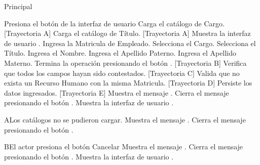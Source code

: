 \begin{UCtrayectoria}{Principal}

    \UCpaso[\UCactor] Presiona el botón  de la interfaz de usuario 
    \UCpaso Carga el catálogo de Cargo. [Trayectoria A]
    \UCpaso Carga el catálogo de Título. [Trayectoria A]
    \UCpaso Muestra la interfaz de usuario .
    \UCpaso[\UCactor] Ingresa la Matricula de Empleado.
    \UCpaso[\UCactor] Selecciona el Cargo.
    \UCpaso[\UCactor] Selecciona el Título.
    \UCpaso[\UCactor] Ingresa el Nombre.
    \UCpaso[\UCactor] Ingresa el Apellido Paterno.
    \UCpaso[\UCactor] Ingresa el Apellido Materno.
    \UCpaso[\UCactor] Termina la operación presionando el botón . [Trayectoria B]
    \UCpaso Verifica que todos los campos hayan sido contestados. [Trayectoria C]
    \UCpaso Valida que no exista un Recurso Humano con la misma Matricula. [Trayectoria D]
    \UCpaso Persiste los datos ingresados. [Trayectoria E]
    \UCpaso Muestra el mensaje .
    \UCpaso[\UCactor] Cierra el mensaje presionando el botón .
    \UCpaso Muestra la interfaz de usuario .
\end{UCtrayectoria}


\begin{UCtrayectoriaA}{A}{Los catálogos no se pudieron cargar.}
    \UCpaso Muestra el mensaje .
    \UCpaso[\UCactor] Cierra el mensaje presionando el botón .
\end{UCtrayectoriaA}


\begin{UCtrayectoriaA}{B}{El actor presiona el botón Cancelar}
    \UCpaso Muestra el mensaje .
    \UCpaso[\UCactor] Cierra el mensaje presionando el botón .
    \UCpaso Muestra la interfaz de usuario .
\end{UCtrayectoriaA}

